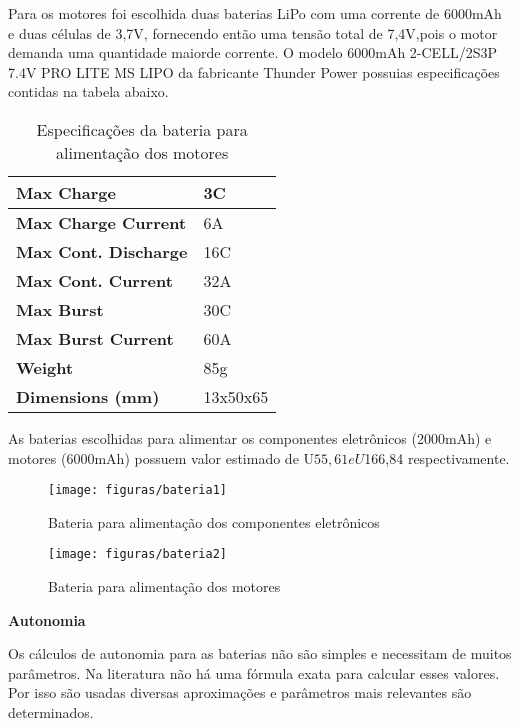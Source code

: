 Para os motores foi escolhida duas baterias LiPo com uma corrente de 6000mAh e duas células de 3,7V, fornecendo então uma tensão total de 7,4V,pois o motor demanda uma quantidade maiorde corrente. O modelo 6000mAh 2-CELL/2S3P 7.4V PRO LITE MS LIPO da fabricante Thunder Power possuias especificações contidas na tabela abaixo. \cite{thunderpower2014}

\begin{table}[H]
\centering
\begin{tabular}{|l|l|}
\hline
\textbf{Max Charge} & 3C \\ \hline
\textbf{Max Charge Current} & 6A \\ \hline
\textbf{Max Cont. Discharge} & 16C \\ \hline
\textbf{Max Cont. Current} & 32A \\ \hline
\textbf{Max Burst} & 30C \\ \hline
\textbf{Max Burst Current} & 60A \\ \hline
\textbf{Weight} & 85g \\ \hline
\textbf{Dimensions (mm)} & 13x50x65 \\ \hline
\end{tabular}
\caption{Especificações da bateria para alimentação dos motores \cite{thunderpower2014}}
\end{table}

As baterias escolhidas para alimentar os componentes eletrônicos (2000mAh) e motores (6000mAh) possuem valor estimado de U$ 55,61 e U$166,84 respectivamente. \cite{thunderpower2014}


\begin{figure}[H]
\centering\texttt{[image: figuras/bateria1]}
\caption{Bateria para alimentação dos componentes eletrônicos}
\end{figure}


\begin{figure}[H]
\centering\texttt{[image: figuras/bateria2]}
\caption{Bateria para alimentação dos motores}
\end{figure}

\textbf{Autonomia}

Os cálculos de autonomia para as baterias não são simples e necessitam de muitos parâmetros. Na literatura não há uma fórmula exata para calcular esses valores. Por isso são usadas diversas aproximações e parâmetros mais relevantes são determinados.

